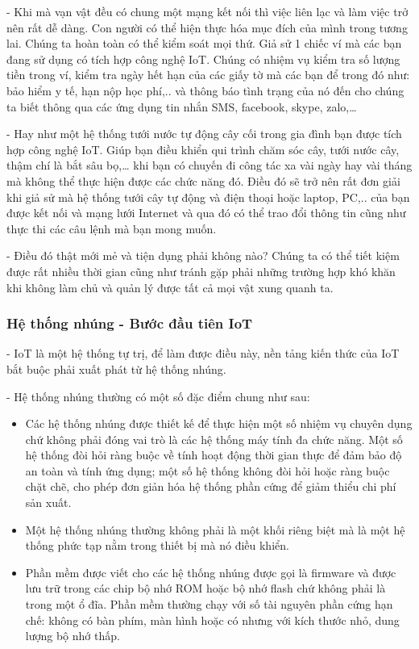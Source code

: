 	- Khi mà vạn vật đều có chung một mạng kết nối thì việc liên lạc và làm việc trở nên rất dễ dàng. Con người có thể hiện thực hóa mục đích của mình trong tương lai. Chúng ta hoàn toàn có thể kiểm soát mọi thứ. Giả sử 1 chiếc ví mà các bạn đang sử dụng có tích hợp công nghệ IoT. Chúng có nhiệm vụ kiểm tra số lượng tiền trong ví, kiểm tra ngày hết hạn của các giấy tờ mà các bạn để trong đó như: bảo hiểm y tế, hạn nộp học phí,.. và thông báo tình trạng của nó đến cho chúng ta biết thông qua các ứng dụng tin nhắn SMS, facebook, skype, zalo,…
	
	- Hay như một hệ thống tưới nước tự động cây cối trong gia đình bạn được tích hợp công nghệ IoT. Giúp bạn điều khiển qui trình chăm sóc cây, tưới nước cây, thậm chí là bắt sâu bọ,… khi bạn có chuyến đi công tác xa vài ngày hay vài tháng mà không thể thực hiện được các chức năng đó. Điều đó sẽ trở nên rất đơn giải khi giả sử mà hệ thống tưới cây tự động và điện thoại hoặc laptop, PC,.. của bạn được kết nối và mạng lưới Internet và qua đó có thể trao đổi thông tin cũng như thực thi các câu lệnh mà bạn mong muốn.
	
	- Điều đó thật mới mẻ và tiện dụng phải không nào? Chúng ta có thể tiết kiệm được rất nhiều thời gian cũng như tránh gặp phải những trường hợp khó khăn khi không làm chủ và quản lý được tất cả mọi vật xung quanh ta.
	\subsubsection{Hệ thống nhúng - Bước đầu tiên IoT}
	- IoT là một hệ thống tự trị, để làm được điều này, nền tảng kiến thức của IoT bắt buộc phải xuất phát từ hệ thống nhúng. 
	
	- Hệ thống nhúng thường có một số đặc điểm chung như sau:
\begin{itemize}[leftmargin=2.2cm]
		\item Các hệ thống nhúng được thiết kế để thực hiện một số nhiệm vụ chuyên dụng chứ không phải đóng vai trò là các hệ thống máy tính đa chức năng. Một số hệ thống đòi hỏi ràng buộc về tính hoạt động thời gian thực để đảm bảo độ an toàn và tính ứng dụng; một số hệ thống không đòi hỏi hoặc ràng buộc chặt chẽ, cho phép đơn giản hóa hệ thống phần cứng để giảm thiểu chi phí sản xuất.
		
		\item Một hệ thống nhúng thường không phải là một khối riêng biệt mà là một hệ thống phức tạp nằm trong thiết bị mà nó điều khiển.
		
		\item Phần mềm được viết cho các hệ thống nhúng được gọi là firmware và được lưu trữ trong các chip bộ nhớ ROM hoặc bộ nhớ flash chứ không phải là trong một ổ đĩa. Phần mềm thường chạy với số tài nguyên phần cứng hạn chế: không có bàn phím, màn hình hoặc có nhưng với kích thước nhỏ, dung lượng bộ nhớ thấp.
\end{itemize}

